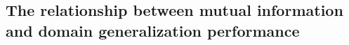 


\subsection{The relationship between mutual information and domain generalization performance}
\label{subsec:relationship_mi_dg}



